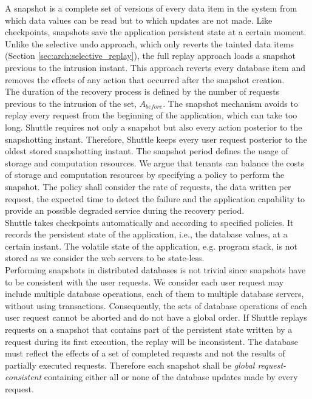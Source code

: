 A snapshot is a complete set of versions of every data item in the system from which data values can be read but to which updates are not made. Like checkpoints, snapshots save the application persistent state at a certain moment. Unlike the selective undo approach, which only reverts the tainted data items (Section \ref{sec:arch:selective_replay}), the full replay approach loads a snapshot previous to the intrusion instant. This approach reverts every database item and removes the effects of any action that occurred after the snapshot creation. \\

The duration of the recovery process is defined by the number of requests previous to the intrusion of the set, $A_{before}$. The snapshot mechanism avoids to replay every request from the beginning of the application, which can take too long. Shuttle requires not only a snapshot but also every action posterior to the snapshotting instant. Therefore, Shuttle keeps every user request posterior to the oldest stored snapshotting instant. The snapshot period defines the usage of storage and computation resources. We argue that tenants can balance the costs of storage and computation resources by specifying a policy to perform the snapshot. The policy shall consider the rate of requests, the data written per request, the expected time to detect the failure and the application capability to provide an possible degraded service during the recovery period. \\

Shuttle takes checkpoints automatically and according to specified policies. It records the persistent state of the application, i.e., the database values, at a certain instant. The volatile state of the application, e.g. program stack, is not stored as we consider the web servers to be state-less. \\


Performing snapshots in distributed databases is not trivial since snapshots have to be consistent with the user requests.  We consider each user request may include multiple database operations, each of them to multiple database servers, without using transactions. Consequently, the sets of database operations of each user request cannot be aborted and do not have a global order. If Shuttle replays requests on a snapshot that contains part of the persistent state written by a request during its first execution, the replay will be inconsistent. The database must reflect the effects of a set of completed requests and not the results of partially executed requests. Therefore each snapshot shall be \emph{global request-consistent} containing either all or none of the database updates made by every request.

